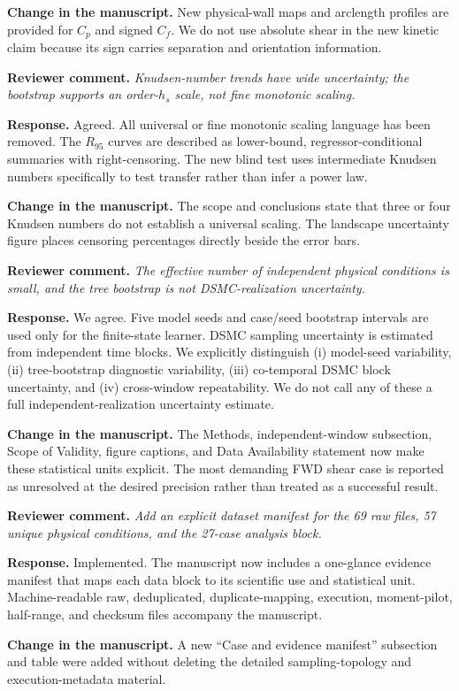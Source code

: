 \documentclass[11pt]{article}
\newcommand{\reviewer}[1]{\vspace{0.4em}\noindent\textbf{Reviewer comment.} \emph{#1}}
\newcommand{\response}{\noindent\textbf{Response.} }
\newcommand{\change}{\noindent\textbf{Change in the manuscript.} }
\begin{document}
\change New physical-wall maps and arclength profiles are provided for $C_p$ and signed $C_f$. We do not use absolute shear in the new kinetic claim because its sign carries separation and orientation information.

\reviewer{Knudsen-number trends have wide uncertainty; the bootstrap supports an order-$h_s$ scale, not fine monotonic scaling.}

\response Agreed. All universal or fine monotonic scaling language has been removed. The $R_{95}$ curves are described as lower-bound, regressor-conditional summaries with right-censoring. The new blind test uses intermediate Knudsen numbers specifically to test transfer rather than infer a power law.

\change The scope and conclusions state that three or four Knudsen numbers do not establish a universal scaling. The landscape uncertainty figure places censoring percentages directly beside the error bars.

\reviewer{The effective number of independent physical conditions is small, and the tree bootstrap is not DSMC-realization uncertainty.}

\response We agree. Five model seeds and case/seed bootstrap intervals are used only for the finite-state learner. DSMC sampling uncertainty is estimated from independent time blocks. We explicitly distinguish (i) model-seed variability, (ii) tree-bootstrap diagnostic variability, (iii) co-temporal DSMC block uncertainty, and (iv) cross-window repeatability. We do not call any of these a full independent-realization uncertainty estimate.

\change The Methods, independent-window subsection, Scope of Validity, figure captions, and Data Availability statement now make these statistical units explicit. The most demanding FWD shear case is reported as unresolved at the desired precision rather than treated as a successful result.

\reviewer{Add an explicit dataset manifest for the 69 raw files, 57 unique physical conditions, and the 27-case analysis block.}

\response Implemented. The manuscript now includes a one-glance evidence manifest that maps each data block to its scientific use and statistical unit. Machine-readable raw, deduplicated, duplicate-mapping, execution, moment-pilot, half-range, and checksum files accompany the manuscript.

\change A new ``Case and evidence manifest'' subsection and table were added without deleting the detailed sampling-topology and execution-metadata material.
\end{document}
